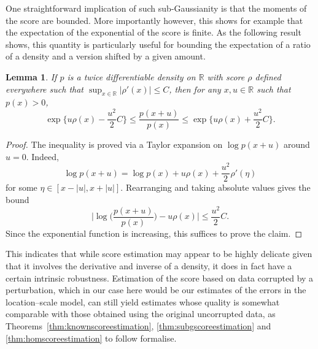 \documentclass[aos]{imsart}
\newcommand{\R}{\mathbb{R}}
\newtheorem{lemma}[theorem]{Lemma}
\begin{document}
	One straightforward implication of such sub-Gaussianity is that the moments of the score are bounded. More importantly however, this shows for example that the expectation of the exponential of the score is finite.
	As the following result shows, this quantity is particularly useful for bounding the expectation of a ratio of a density and a version shifted by a given amount.
	\begin{lemma}
		\label{lem:densityratiobound}
		If $p$ is a twice differentiable density on $\R$ with score $\rho$ defined everywhere such that $ \sup_{x\in\R} |\rho'(x)| \leq C$, then for any $x,u\in\R$ such that $p(x)>0$, \begin{equation*}
			\exp\bigg\{u\rho(x) - \frac{u^2}{2} C\bigg\} \leq \frac{p(x+u)}{p(x)} \leq \exp\bigg\{u\rho(x) + \frac{u^2}{2} C\bigg\}.
		\end{equation*}
	\end{lemma}
	\begin{proof}
		The inequality is proved via a Taylor expansion on $\log p(x+u)$ around $u=0$. Indeed,
		\begin{equation*}
			\log p(x+u) = \log p(x) + u \rho(x) + \frac{u^2}{2} \rho'(\eta)
		\end{equation*}
		for some $\eta\in[x-|u|,x+|u|]$. Rearranging and taking absolute values gives the bound
		\begin{equation*}
			\bigg| \log \bigg(\frac{p(x+u)}{p(x)}\bigg) 
			- u \rho(x) \bigg| \leq    
			\frac{u^2}{2} C.
		\end{equation*}
		Since the exponential function is increasing, this suffices to prove the claim.
	\end{proof}
	This indicates that while score estimation may appear to be highly delicate given that it involves the derivative and inverse of a density, it does in fact have a certain intrinsic robustness.
	Estimation of the score based on data corrupted by a perturbation, which in our case here would be our estimates of the errors in the location--scale model, can still yield estimates whose quality is somewhat comparable with those obtained using the original uncorrupted data, as Theorems~\ref{thm:knownscoreestimation}, \ref{thm:subgscoreestimation} and \ref{thm:homscoreestimation} to follow formalise.
	
\end{document}
